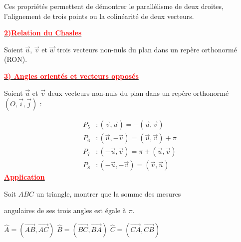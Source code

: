 \documentclass{article}
\begin{document}
Ces propriétés permettent de démontrer le parallélisme de deux droites, l'alignement de trois points ou la colinéarité de deux vecteurs.

\underline{\textbf{\textcolor{red}{2)Relation du Chasles}}}

Soient $\vec{u}$, $\vec{v}$ et $\vec{w}$ trois vecteurs non-nuls du plan dans un repère orthonormé (RON).

\underline{\textbf{\textcolor{red}{3) Angles orientés et vecteurs opposés}}}

Soient $\vec{u}$ et $\vec{v}$ deux vecteurs non-nuls du plan dans un repère orthonormé $(O, \vec{i}, \vec{j})$ :

\begin{align*}
    P_5 & : (\vec{v}, \vec{u}) = - (\vec{u}, \vec{v}) \\
    P_6 & : (\vec{u}, -\vec{v}) = (\vec{u}, \vec{v}) + \pi \\
    P_7 & : (-\vec{u}, \vec{v}) = \pi + (\vec{u}, \vec{v}) \\
    P_8 & : (-\vec{u}, -\vec{v}) = (\vec{v}, \vec{u})
\end{align*}
\underline{\textbf{\textcolor{red}{Application}}}

Soit $ABC$ un triangle, montrer que la somme des mesures 

angulaires de ses trois angles est égale à $\pi$.

\begin{center}
\end{center}

\(
\widehat{A} = (\overrightarrow{AB}, \overrightarrow{AC})
\)
\(
\widehat{B} = (\overrightarrow{BC}, \overrightarrow{BA})
\)
\(
\widehat{C} = (\overrightarrow{CA}, \overrightarrow{CB})
\)
\end{document}
